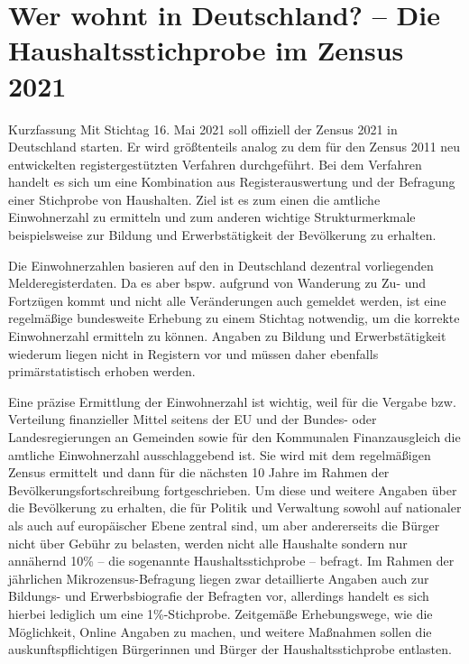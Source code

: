 \chapter{Wer wohnt in Deutschland? – Die Haushaltsstichprobe im Zensus 2021}
\minitoc
\begin{myblock}{Kurzfassung}
Mit Stichtag 16. Mai 2021 soll offiziell der Zensus 2021 in Deutschland starten. Er wird größtenteils analog zu dem für den Zensus 2011 neu entwickelten registergestützten Verfahren durchgeführt. Bei dem Verfahren handelt es sich um eine Kombination aus Registerauswertung und der Befragung einer Stichprobe von Haushalten. Ziel ist es zum einen die amtliche Einwohnerzahl zu ermitteln und zum anderen wichtige Strukturmerkmale beispielsweise zur Bildung und Erwerbstätigkeit der Bevölkerung zu erhalten.
\end{myblock}


Die Einwohnerzahlen basieren auf den in Deutschland dezentral vorliegenden Melderegisterdaten. Da es aber bspw. aufgrund von Wanderung zu Zu- und Fortzügen kommt und nicht alle Veränderungen auch gemeldet werden, ist eine regelmäßige bundesweite Erhebung zu einem Stichtag notwendig, um die korrekte Einwohnerzahl ermitteln zu können. Angaben zu Bildung und Erwerbstätigkeit wiederum liegen nicht in Registern vor und müssen daher ebenfalls primärstatistisch erhoben werden.\par

Eine präzise Ermittlung der Einwohnerzahl ist wichtig, weil für die Vergabe bzw. Verteilung finanzieller Mittel seitens der EU und der Bundes- oder Landesregierungen an Gemeinden sowie für den Kommunalen Finanzausgleich die amtliche Einwohnerzahl ausschlaggebend ist. Sie wird mit dem regelmäßigen Zensus ermittelt und dann für die nächsten 10 Jahre im Rahmen der Bevölkerungsfortschreibung fortgeschrieben. Um diese und weitere Angaben über die Bevölkerung zu erhalten, die für Politik und Verwaltung sowohl auf nationaler als auch auf europäischer Ebene zentral sind, um aber andererseits die Bürger nicht über Gebühr zu belasten, werden nicht alle Haushalte sondern nur annähernd 10\% – die sogenannte Haushaltsstichprobe – befragt. Im Rahmen der jährlichen Mikrozensus-Befragung liegen zwar detaillierte Angaben auch zur Bildungs- und Erwerbsbiografie der Befragten vor, allerdings handelt es sich hierbei lediglich um eine 1\%-Stichprobe. Zeitgemäße Erhebungswege, wie die Möglichkeit, Online Angaben zu machen, und weitere Maßnahmen sollen die auskunftspflichtigen Bürgerinnen und Bürger der Haushaltsstichprobe entlasten.\par

